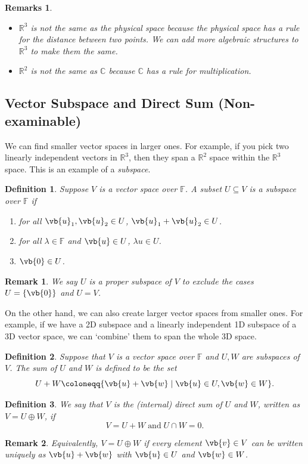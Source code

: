 \documentclass{article}
\theoremstyle{plain}\theoremheaderfont{\normalfont\itshape}\theorembodyfont{\rmfamily}\theoremseparator{.}\newtheorem*{rem}{Remark}\newtheorem*{ex}{Example}\newtheorem*{proof}{Proof}\newtheorem*{altp}{Alternative proof}
\theoremstyle{plain}\theoremheaderfont{\normalfont\bfseries}\theorembodyfont{\rmfamily}\theoremseparator{.}\newtheorem{thm}{Theorem}[section]\newtheorem{lem}[thm]{Lemma}\newtheorem{prop}[thm]{Proposition}\newtheorem*{cor}{Corollary}\newtheorem{defn}[thm]{Definition}\newtheorem{clm}[thm]{Claim}\newtheorem{clminproof}{Claim}
\theoremstyle{break}\theoremheaderfont{\normalfont\itshape}\theorembodyfont{\rmfamily}\theoremseparator{.\medskip}\newtheorem*{proofskip}{Proof}\newtheorem*{exs}{Examples}\newtheorem*{rems}{Remarks}
\theoremstyle{break}\theoremheaderfont{\normalfont\bfseries}\theorembodyfont{\rmfamily}\theoremseparator{.\medskip}\newtheorem{lemskip}[thm]{Lemma}\newtheorem{defnskip}[thm]{Definition}\newtheorem{propskip}[thm]{Proposition}\newtheorem{thmskip}[thm]{Theorem}
\numberwithin{equation}{section}
\begin{document}
	\begin{rems}
		\begin{itemize}[topsep=0pt]
			\item \(\mathbb{R}^3\) is not the same as the physical space because the physical space has a rule for the distance between two points. We can add more algebraic structures to \(\mathbb{R}^3\) to make them the same.
			\item \(\mathbb{R}^2\) is not the same as \(\mathbb{C}\) because \(\mathbb{C}\) has a rule for multiplication.
		\end{itemize}
	\end{rems}
	\subsection{Vector Subspace and Direct Sum (Non-examinable)}
	We can find smaller vector spaces in larger ones. For example, if you pick two linearly independent vectors in \(\mathbb{R}^3\), then they span a \(\mathbb{R}^2\) space within the \(\mathbb{R}^3\) space. This is an example of a \textit{subspace}.
	\begin{defn}
		Suppose \(V\) is a vector space over \(\mathbb{F}\). A subset \(U\subseteq V\) is a \textit{subspace} over \(\mathbb{F}\) if
		\begin{enumerate}[topsep=0pt]
			\item for all \(\vb{u}_1,\vb{u}_2\in U\), \(\vb{u}_1+\vb{u}_2\in U\).
			\item for all \(\lambda\in\mathbb{F}\) and \(\vb{u}\in U\), \(\lambda u\in U\).
			\item \(\vb{0}\in U\).
		\end{enumerate}
	\end{defn}
	\begin{rem}
		We say \(U\) is a \textit{proper subspace} of \(V\) to exclude the cases \(U=\{\vb{0}\}\) and \(U=V\).
	\end{rem}
	On the other hand, we can also create larger vector spaces from smaller ones. For example, if we have a 2D subspace and a linearly independent 1D subspace of a 3D vector space, we can `combine' them to span the whole 3D space.
	\begin{defn}
		Suppose that \(V\) is a vector space over \(\mathbb{F}\) and \(U, W\) are subspaces of \(V\). The \textit{sum} of \(U\) and \(W\) is defined to be the set
		\[U+W\coloneqq\{\vb{u}+\vb{w} \mid \vb{u}\in U, \vb{w}\in W\}.\]
	\end{defn}
	\begin{defn}
		We say that \(V\) is the \textit{(internal) direct sum} of \(U\) and \(W\), written as \(V=U\oplus W\), if
		\[V=U+W\;\text{and}\; U \cap W=0.\]
	\end{defn}
	\begin{rem}
		Equivalently, \(V=U\oplus W\) if every element \(\vb{v}\in V\) can be written uniquely as \(\vb{u}+\vb{w}\) with \(\vb{u}\in U\) and \(\vb{w}\in W\).
	\end{rem}
\end{document}
